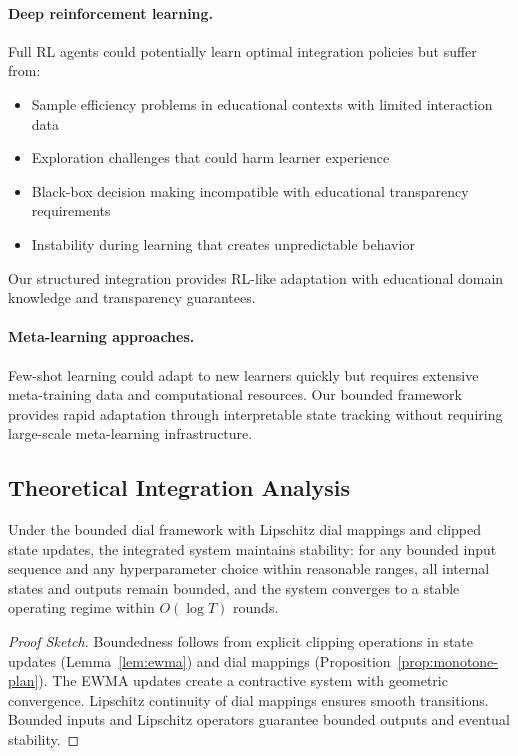 \paragraph{Deep reinforcement learning.} Full RL agents could potentially learn optimal integration policies but suffer from:
\begin{itemize}
  \item Sample efficiency problems in educational contexts with limited interaction data
  \item Exploration challenges that could harm learner experience
  \item Black-box decision making incompatible with educational transparency requirements
  \item Instability during learning that creates unpredictable behavior
\end{itemize}
Our structured integration provides RL-like adaptation with educational domain knowledge and transparency guarantees.

\paragraph{Meta-learning approaches.} Few-shot learning could adapt to new learners quickly but requires extensive meta-training data and computational resources. Our bounded framework provides rapid adaptation through interpretable state tracking without requiring large-scale meta-learning infrastructure.

\subsection{Theoretical Integration Analysis}
\label{app:integration-theory}

\begin{theorem}
\label{thm:integration-stability}
Under the bounded dial framework with Lipschitz dial mappings and clipped state updates, the integrated system maintains stability: for any bounded input sequence and any hyperparameter choice within reasonable ranges, all internal states and outputs remain bounded, and the system converges to a stable operating regime within $O(\log T)$ rounds.
\end{theorem}

\begin{proof}[Proof Sketch]
Boundedness follows from explicit clipping operations in state updates (Lemma~\ref{lem:ewma}) and dial mappings (Proposition~\ref{prop:monotone-plan}). The EWMA updates create a contractive system with geometric convergence. Lipschitz continuity of dial mappings ensures smooth transitions. Bounded inputs and Lipschitz operators guarantee bounded outputs and eventual stability.
\end{proof}

